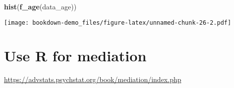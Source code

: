 \documentclass[]{book}
\newenvironment{Shaded}{\begin{snugshade}}{\end{snugshade}}
\newcommand{\KeywordTok}[1]{\textcolor[rgb]{0.13,0.29,0.53}{\textbf{#1}}}
\newcommand{\NormalTok}[1]{#1}
\begin{document}
\begin{Shaded}
\begin{Highlighting}[]
\KeywordTok{hist}\NormalTok{(}\KeywordTok{f_age}\NormalTok{(data_age))}
\end{Highlighting}
\end{Shaded}

\texttt{[image: bookdown-demo\_files/figure-latex/unnamed-chunk-26-2.pdf]}

\hypertarget{use-r-for-mediation}{%
\chapter{Use R for mediation}\label{use-r-for-mediation}}

\url{https://advstats.psychstat.org/book/mediation/index.php}


\end{document}
